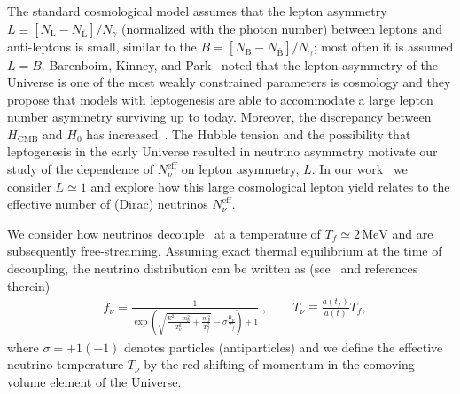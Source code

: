 The standard cosmological model assumes that the lepton asymmetry $L\equiv  [N_\mathrm{L}-N_{\overline{\mathrm{L}}}] /N_\gamma $  (normalized with the photon number) 
between leptons and anti-leptons is small, similar to the  $B=[N_\mathrm{B}-N_{\overline{\mathrm{B}}}]/N_\gamma $; most often it is assumed $L=B$. Barenboim, Kinney, and Park~\cite{Barenboim:2016shh,Barenboim:2017dfq} noted that the lepton asymmetry of the Universe is one of the most weakly constrained parameters is cosmology and they propose that models with leptogenesis are able to accommodate a large lepton number asymmetry surviving up to today.  Moreover, the discrepancy between $H_\mathrm{CMB}$ and $H_0$ has increased~\cite{riess2018new,Riess:2018byc,Planck:2018vyg}. The Hubble tension and the possibility that leptogenesis in the early Universe resulted in neutrino asymmetry motivate our study of the dependence of $N_\nu^{\mathrm{eff}}$ on lepton asymmetry, $L$. In our work~\cite{Yang:2018oqg} we consider $L\simeq 1$ and explore how this large cosmological lepton yield relates to the effective number of (Dirac) neutrinos $N^{\mathrm{eff}}_\nu$. 

 We consider how neutrinos decouple~\cite{Birrell:2014gea} at a temperature of $T_f\simeq 2\,\mathrm{MeV}$ and are subsequently free-streaming. Assuming exact thermal equilibrium at the time of decoupling, the neutrino distribution can be   written as (see~\cite{Birrell:2012gg} and references therein)
\begin{align}
\label{fnudef}
&f_\nu=\frac{1}{\exp{\left(\sqrt{\frac{E^2-m_\nu^2}{T_\nu^2}+\frac{m^2_\nu}{T^2_f}}-\sigma\frac{\mu_\nu}{T_f}\right)+1}}\;,\qquad T_\nu\equiv\frac{a(t_f)}{a(t)}T_f,
\end{align}
where $\sigma=+1(-1)$ denotes particles (antiparticles) and we define the effective neutrino temperature $T_\nu$  by the red-shifting of momentum in the comoving volume element of the Universe.

